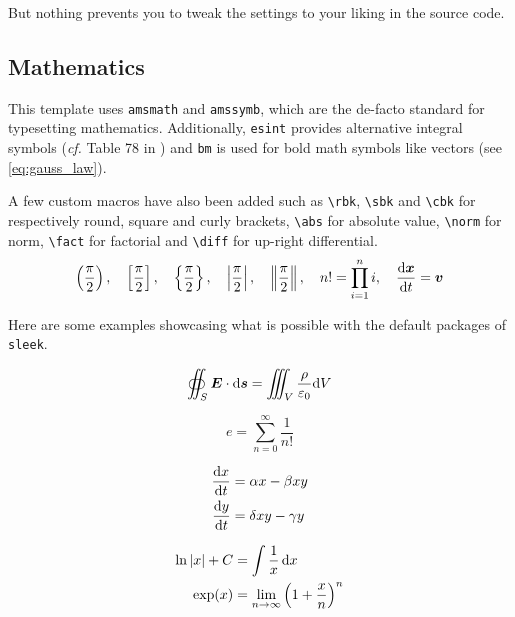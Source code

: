\documentclass[a4paper, 12pt]{report}
\def\tbs{\textbackslash}
\begin{document}
    But nothing prevents you to tweak the settings to your liking in the source code.

    \subsection{Mathematics}

    This template uses \texttt{amsmath} and \texttt{amssymb}, which are the de-facto standard for typesetting mathematics. Additionally, \texttt{esint} provides alternative integral symbols (\emph{cf.} Table 78 in \cite{pakin2020comprehensive}) and \texttt{bm} is used for bold math symbols like vectors (see \eqref{eq:gauss_law}).

    A few custom macros have also been added such as \texttt{\tbs{}rbk}, \texttt{\tbs{}sbk} and \texttt{\tbs{}cbk} for respectively round, square and curly brackets, \texttt{\tbs{}abs} for absolute value, \texttt{\tbs{}norm} for norm, \texttt{\tbs{}fact} for factorial and \texttt{\tbs{}diff} for up-right differential.
    $$
        \left(\frac{\pi}{2}\right), \quad \left[\frac{\pi}{2}\right], \quad \left\{\frac{\pi}{2}\right\}, \quad \left|\frac{\pi}{2}\right|, \quad \left\|\frac{\pi}{2}\right\|, \quad n! = \prod_{i = 1}^{n} i, \quad \frac{\mathrm{d} \bm{x}}{\mathrm{d} t} = \bm{v}
    $$

    Here are some examples showcasing what is possible with the default packages of \texttt{sleek}.

    \begin{equation}\label{eq:gauss_law}
        \oiint_S \bm{E} \cdot \mathrm{d} \bm{s} = \iiint_V \frac{\rho}{\varepsilon_0} \mathrm{d} V
    \end{equation}

    \begin{equation*}
        e = \sum_{n=0}^\infty \frac{1}{n!}
    \end{equation*}

    \begin{subequations}
        \begin{align}
            \frac{\mathrm{d} x}{\mathrm{d} t} & = \alpha x - \beta xy \\
            \frac{\mathrm{d} y}{\mathrm{d} t} & = \delta xy - \gamma y
        \end{align}
    \end{subequations}

    \begin{align*}
        \ln \left|x\right| + C & = \int \frac{1}{x} \,\mathrm{d} x \\
        \exp(x) & = \lim_{n \to \infty} \left(1 + \frac{x}{n}\right)^n
    \end{align*}
\end{document}
